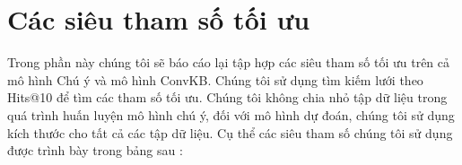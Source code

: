 \appendix

\chapter{Các siêu tham số tối ưu}
\label{Appendix1}

Trong phần này chúng tôi sẽ báo cáo lại tập hợp các siêu tham số tối ưu trên cả mô hình Chú ý và mô hình ConvKB.
Chúng tôi sử dụng tìm kiếm lưới theo Hits@10 để tìm các tham số tối ưu. Chúng tôi không chia nhỏ tập dữ liệu trong quá trình huấn luyện mô hình chú ý,
đối với mô hình dự đoán, chúng tôi sử dụng kích thước cho tất cả các tập dữ liệu. Cụ thể các siêu tham số chúng tôi sử dụng được trình bày trong bảng sau :

\begin{table}[htbp]
	\begin{center}
\end{center}
\end{table}